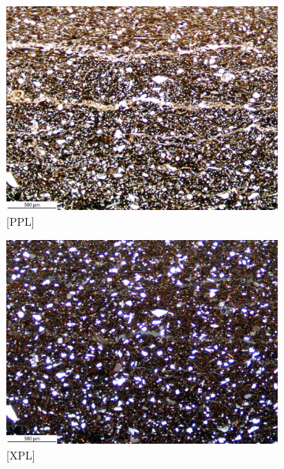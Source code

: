 \documentclass[a4paper]{article}
\begin{document}
\begin{figure}[H]
	\centering
	\begin{subfigure}[t]{.49\textwidth}
		\includegraphics[width=\textwidth]{ThinSections/54-1_4x_PPL.jpg}
		\caption{[PPL]}
	\end{subfigure}\hspace{.5em}\hfill
	\begin{subfigure}[t]{.49\textwidth}
		\includegraphics[width=\textwidth]{ThinSections/54-1_4x_XPL.jpg}
		\caption{[XPL]}
	\end{subfigure}
	\begin{subfigure}[t]{.32\textwidth}

\end{subfigure}
\end{figure}
\end{document}
